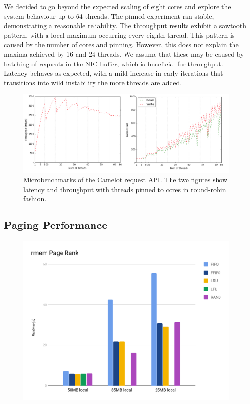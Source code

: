 We decided to go beyond the expected scaling of eight cores and explore the system behaviour up to 64 threads. The pinned experiment ran stable, demonstrating a reasonable reliability. The throughput results exhibit a sawtooth pattern, with a local maximum occurring  every eighth thread. This pattern is caused by the number of cores and pinning. However, this does not explain the maxima achieved by 16 and 24 threads. We assume that these may be caused by batching of requests in the NIC buffer, which is beneficial for throughput.
Latency behaves as expected, with a mild increase in early iterations that transitions into wild instability the more threads are added.

\begin{figure}[h]
    \includegraphics[width=\textwidth]{fig/threads_pinned}
    \caption{Microbenchmarks of the Camelot request API. The two figures show latency and throughput with threads pinned to cores in round-robin fashion.}
    \label{fig:threads}
\end{figure}

\subsection{Paging Performance}

\begin{figure}[H]
    \includegraphics[width=\columnwidth]{fig/policyPerformance}
    \caption{}
    \label{fig:policyPerformance}
\end{figure}

